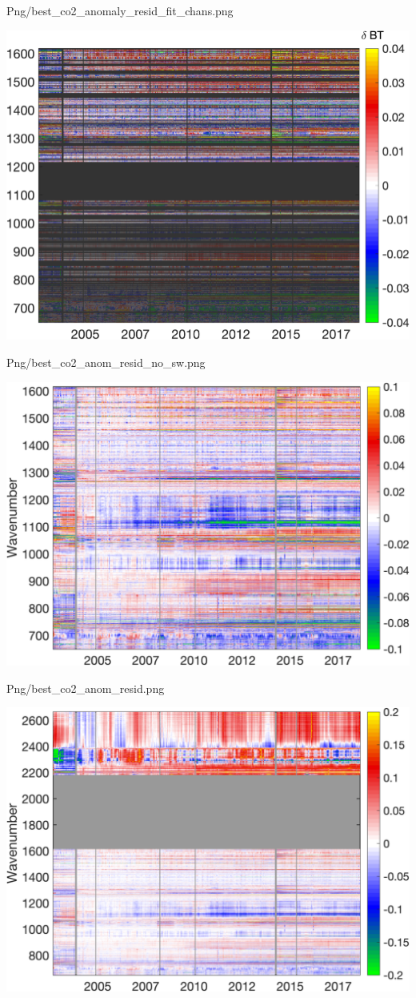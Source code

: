 \documentclass[presentation]{beamer}
\begin{document}
\begin{frame}[label={sec:org8e52b0b}]{Png/best\_co2\_anomaly\_resid\_fit\_chans.png}
\begin{center}
\includegraphics[width=0.7\linewidth]{./Figs/Png/best_co2_anomaly_resid_fit_chans.png}
\end{center}
\end{frame}

\begin{frame}[label={sec:org8435298}]{Png/best\_co2\_anom\_resid\_no\_sw.png}
\begin{center}
\includegraphics[width=0.7\linewidth]{./Figs/Png/best_co2_anom_resid_no_sw.png}
\end{center}
\end{frame}

\begin{frame}[label={sec:org7bf95d1}]{Png/best\_co2\_anom\_resid.png}
\begin{center}
\includegraphics[width=0.7\linewidth]{./Figs/Png/best_co2_anom_resid.png}
\end{center}
\end{frame}
\end{document}
